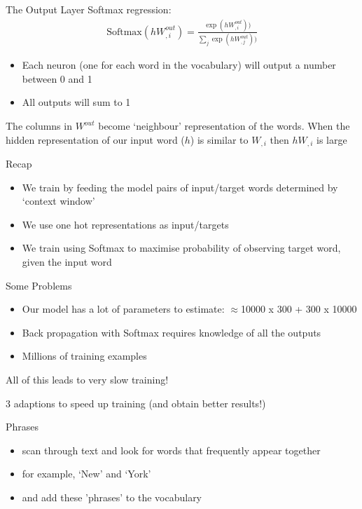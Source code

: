 \documentclass{beamer}
\begin{document}
	\begin{frame}[allowframebreaks]{The Output Layer}
		Softmax regression:
		\begin{align*}
		\text{Softmax}(h W_{,i}^{out}) = \frac{\exp(h W_{,i}^{out}))}{\sum_{j}\exp(h W_{,j}^{out}))}
		\end{align*}
		\begin{itemize}
			\item Each neuron (one for each word in the vocabulary) will output a number between 0 and 1
			\item All outputs will sum to 1
		\end{itemize}
		The columns in $W^{out}$ become `neighbour' representation of the words.
		When the hidden representation of our input word ($h$) is similar to $W_{,i}$ then $hW_{,i}$ is large
	\end{frame}
	
	\begin{frame}{Recap}
		\begin{itemize}
			\item We train by feeding the model pairs of input/target words determined by `context window'
			\item We use one hot representations as input/targets
			\item We train using Softmax to maximise probability of observing target word, given the input word
		\end{itemize}
	\end{frame}
	
	\begin{frame}{Some Problems}
		
		\begin{itemize}
			\item Our model has a lot of parameters to estimate: $\approx$10000 x 300 + 300 x 10000
			\item Back propagation with Softmax requires knowledge of all the outputs
			\item Millions of training examples
		\end{itemize}
		
		All of this leads to very slow training!
		
		3 adaptions to speed up training (and obtain better results!)
		
		
	\end{frame}
	
	\begin{frame}{Phrases}
		\begin{itemize}
			\item scan through text and look for words that frequently appear together
			\item for example, `New' and `York'
			\item and add these 'phrases' to the vocabulary
		\end{itemize}
	\end{frame}
	
\end{document}
